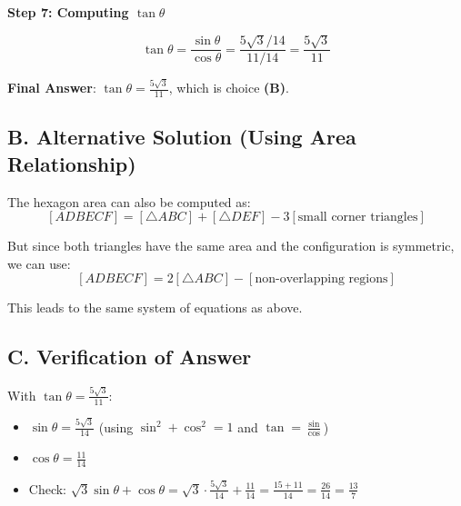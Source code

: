 \documentclass[12pt]{article}
\begin{document}
\begin{solutionbox}
\textbf{Step 7: Computing $\tan\theta$}

$$\tan\theta = \frac{\sin\theta}{\cos\theta} = \frac{5\sqrt{3}/14}{11/14} = \frac{5\sqrt{3}}{11}$$

\textbf{Final Answer}: $\tan\theta = \frac{5\sqrt{3}}{11}$, which is choice \textbf{(B)}.

\subsection*{B. Alternative Solution (Using Area Relationship)}

The hexagon area can also be computed as:
$$[ADBECF] = [\triangle ABC] + [\triangle DEF] - 3[\text{small corner triangles}]$$

But since both triangles have the same area and the configuration is symmetric, we can use:
$$[ADBECF] = 2[\triangle ABC] - [\text{non-overlapping regions}]$$

This leads to the same system of equations as above.

\subsection*{C. Verification of Answer}

With $\tan\theta = \frac{5\sqrt{3}}{11}$:
\begin{itemize}
    \item $\sin\theta = \frac{5\sqrt{3}}{14}$ (using $\sin^2 + \cos^2 = 1$ and $\tan = \frac{\sin}{\cos}$)
    \item $\cos\theta = \frac{11}{14}$
    \item Check: $\sqrt{3}\sin\theta + \cos\theta = \sqrt{3} \cdot \frac{5\sqrt{3}}{14} + \frac{11}{14} = \frac{15 + 11}{14} = \frac{26}{14} = \frac{13}{7}$ \checkmark
\end{itemize}

\end{solutionbox}
\end{document}
